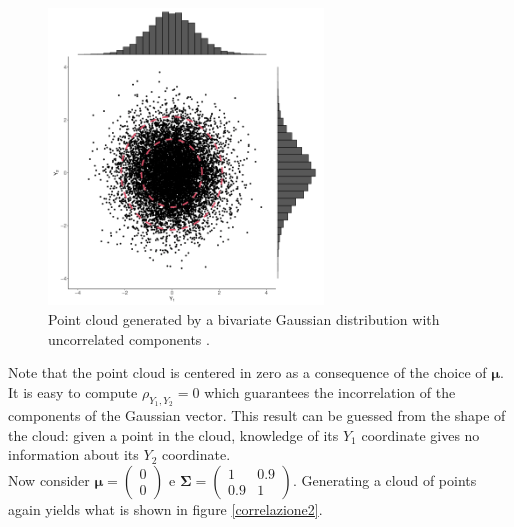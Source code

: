 \begin{figure}[h]
    \centering
    \includegraphics[width=0.65\textwidth]{images/Gaussiane/VettoreBivariatoIndipendenza.png}
    \caption{Point cloud generated by a bivariate Gaussian distribution with uncorrelated components \cite{wilkinson_introduction_2020}.}
    \label{correlazione1}
\end{figure}


\newpage
Note that the point cloud is centered in zero as a consequence of the choice of $\bm{\mu}$. It is easy to compute $\rho_{Y_1,Y_2}=0$ which guarantees the incorrelation of the components of the Gaussian vector. This result can be guessed from the shape of the cloud: given a point in the cloud, knowledge of its $Y_1$ coordinate gives no information about its $Y_2$ coordinate.\\
Now consider $\bm{\mu} = \begin{pmatrix}0\\0\end{pmatrix}$ e $\mathbf{\Sigma}=\begin{pmatrix}1&0.9\\0.9&1\end{pmatrix}$. Generating a cloud of points again yields what is shown in figure \ref{correlazione2}.\\


